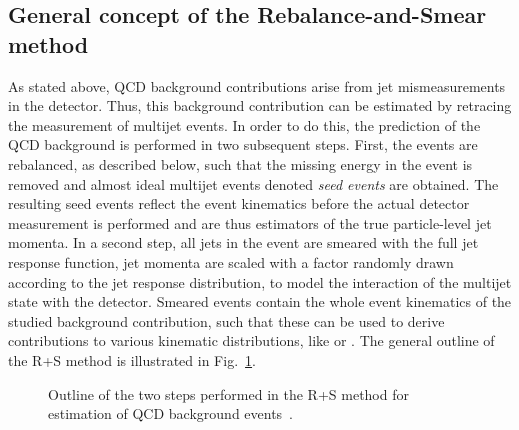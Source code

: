 \subsection{General concept of the Rebalance-and-Smear method}
\label{subsec:RPlusS_concept} 
As stated above, QCD background contributions arise from jet mismeasurements in the detector. Thus, this background contribution can be estimated by retracing the measurement of multijet events. In order to do this, the prediction of the QCD background is performed in two subsequent steps. First, the events are rebalanced, as described below, such that the missing energy in the event is removed and almost ideal multijet events denoted \textit{seed events} are obtained. The resulting seed events reflect the event kinematics before the actual detector measurement is performed and are thus estimators of the true particle-level jet momenta. In a second step, all jets in the event are smeared with the full jet response function, \ie jet momenta are scaled with a factor randomly drawn according to the jet response distribution, to model the interaction of the multijet state with the detector. Smeared events contain the whole event kinematics of the studied background contribution, such that these can be used to derive contributions to various kinematic distributions, like \HT or \MHT. The general outline of the R+S method is illustrated in Fig.~\ref{fig:RPlusS_concept}.
\begin{figure}[!t]
  \centering
  \caption{Outline of the two steps performed in the R+S method for estimation of QCD background events~\cite{MSchrode}.}
  \label{fig:RPlusS_concept}
\end{figure}
